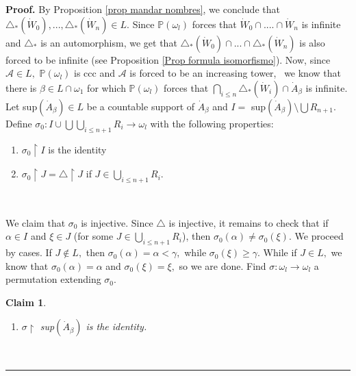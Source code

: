 \documentclass{article}%
\newtheorem{claim}[theorem]{Claim}
\newenvironment{proof}[1][Proof]{\noindent\textbf{#1.} }{\ \rule{0.5em}{0.5em}}
\begin{document}
\begin{proof}
By Proposition \ref{prop mandar nombres}, we conclude that $\triangle_{\ast
}(\dot{W}_{0}),...,\triangle_{\ast}(\dot{W}_{n})\in L.$ Since $\mathbb{P}%
\left(  \omega_{l}\right)  $ forces that $\dot{W}_{0}\cap....\cap\dot{W}_{n}$
is infinite and $\triangle_{\ast}$ is an automorphism, we get that
$\triangle_{\ast}(\dot{W}_{0})\cap...\cap\triangle_{\ast}(\dot{W}_{n})$ is
also forced to be infinite (see Proposition \ref{Prop formula isomorfismo}).
Now, since $\mathcal{A}\in L,$ $\mathbb{P}\left(  \omega_{l}\right)  $ is ccc
and $\mathcal{A}$ is forced to be an increasing tower, \ we know that there is
$\beta\in L\cap\omega_{1}$ for which $\mathbb{P}\left(  \omega_{l}\right)  $
forces that $\bigcap\limits_{i\leq n}\triangle_{\ast}(\dot{W}_{i})\cap\dot
{A}_{\beta}$ is infinite. Let \textsf{sup}$(\dot{A}_{\beta})\in L$ be a
countable support of $\dot{A}_{\beta}$ and $I=$ \textsf{sup}$(\dot{A}_{\beta
})\setminus\bigcup R_{n+1}$. Define $\sigma_{0}:I\cup\bigcup\bigcup
\limits_{i\leq n+1}R_{i}\longrightarrow\omega_{l}$ with the following properties:

\begin{enumerate}
\item $\sigma_{0}\upharpoonright I$ is the identity

\item $\sigma_{0}\upharpoonright J=\triangle\upharpoonright J$ if $J\in
\bigcup\limits_{i\leq n+1}R_{i}.$
\end{enumerate}

\qquad\ \ 

We claim that $\sigma_{0}$ is injective. Since $\triangle$ is injective, it
remains to check that if $\alpha\in I$ and $\xi\in J$ (for some $J\in
\bigcup\limits_{i\leq n+1}R_{i}$), then $\sigma_{0}\left(  \alpha\right)
\neq\sigma_{0}\left(  \xi\right)  .$ We proceed by cases. If $J\notin L,$ then
$\sigma_{0}\left(  \alpha\right)  =\alpha<\gamma,$ while $\sigma_{0}\left(
\xi\right)  \geq\gamma.$ While if $J\in L,$ we know that $\sigma_{0}\left(
\alpha\right)  =\alpha$ and $\sigma_{0}\left(  \xi\right)  =\xi,$ so we are
done. Find $\sigma:\omega_{l}\longrightarrow\omega_{l}$ a permutation
extending $\sigma_{0}.$

\begin{claim}
\qquad\qquad\qquad\qquad\qquad\ \ \ \ \ \ \ \qquad\ \ \ \ \ \ \ \ \ \ \ \ \ \ \ 

\begin{enumerate}
\item $\sigma\upharpoonright$ \textsf{sup}$(\dot{A}_{\beta})$ is the identity.


\end{enumerate}
\end{claim}
\end{proof}
\end{document}
